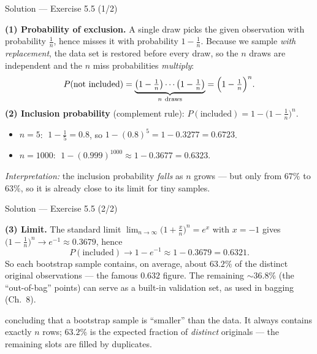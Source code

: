 \documentclass[aspectratio=169,11pt]{beamer}
\begin{document}
\begin{frame}{Solution --- Exercise 5.5 (1/2)}
  \begin{solutionbox}
    \textbf{(1) Probability of exclusion.}
    A single draw picks the given observation with probability
    $\tfrac1n$, hence misses it with probability $1 - \tfrac1n$.
    Because we sample \emph{with replacement}, the data set is restored
    before every draw, so the $n$ draws are independent and the $n$
    miss probabilities \emph{multiply}:
    \[
      P(\text{not included})
      = \underbrace{\bigl(1-\tfrac1n\bigr)\cdots\bigl(1-\tfrac1n\bigr)}_{n\ \text{draws}}
      = \Bigl(1 - \tfrac1n\Bigr)^n .
    \]
    \textbf{(2) Inclusion probability} (complement rule):
    $P(\text{included}) = 1 - \bigl(1 - \tfrac1n\bigr)^n$.
    \begin{itemize}
      \item $n = 5$: $\;1 - \tfrac15 = 0.8$, so
            $1 - (0.8)^5 = 1 - 0.3277 = 0.6723$.
      \item $n = 1000$: $\;1 - (0.999)^{1000} \approx 1 - 0.3677
            = 0.6323$.
    \end{itemize}
    \emph{Interpretation:} the inclusion probability \emph{falls} as $n$
    grows --- but only from $67\%$ to $63\%$, so it is already close to
    its limit for tiny samples.
  \end{solutionbox}
\end{frame}

\begin{frame}{Solution --- Exercise 5.5 (2/2)}
  \begin{solutionbox}
    \textbf{(3) Limit.}
    The standard limit $\lim_{n\to\infty}\bigl(1+\tfrac{x}{n}\bigr)^n
    = e^{x}$ with $x = -1$ gives
    $\bigl(1-\tfrac1n\bigr)^n \to e^{-1} \approx 0.3679$, hence
    \[
      P(\text{included}) \to 1 - e^{-1} \approx 1 - 0.3679 = 0.6321 .
    \]
    So each bootstrap sample contains, on average, about $63.2\%$ of the
    distinct original observations --- the famous $0.632$ figure. The
    remaining $\sim 36.8\%$ (the ``out-of-bag'' points) can serve as a
    built-in validation set, as used in bagging (Ch.~8).
  \end{solutionbox}
  \begin{mistake}
    concluding that a bootstrap sample is
    ``smaller'' than the data. It always contains exactly $n$ rows;
    $63.2\%$ is the expected fraction of \emph{distinct} originals ---
    the remaining slots are filled by duplicates.
  \end{mistake}
\end{frame}
\end{document}
